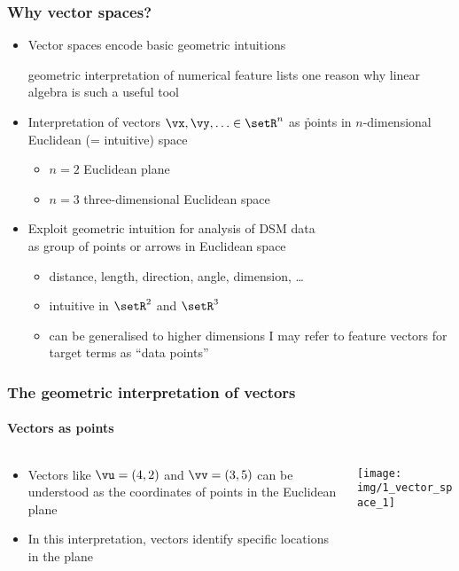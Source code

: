 \begin{frame}
  \frametitle{Why vector spaces?}

  \begin{itemize}
    \item Vector spaces encode basic geometric intuitions
      \begin{itemize}
      \itemhand geometric interpretation of numerical feature lists
      \itemhand one reason why linear algebra is such a useful tool
      \end{itemize}
      \pause\gap
  \item Interpretation of vectors $\vx, \vy, \ldots \in \setR^n$ as
    \h{points} in $n$-dimensional Euclidean (= intuitive) space
    \begin{itemize}
    \item $n=2$ \so Euclidean plane
    \item $n=3$ \so three-dimensional Euclidean space
    \end{itemize}
    \pause\gap
  \item Exploit geometric intuition for analysis of DSM data\\
    as group of points or arrows in Euclidean space
    \begin{itemize}
    \item distance, length, direction, angle, dimension, \ldots
    \item intuitive in $\setR^2$ and $\setR^3$
    \item can be generalised to higher dimensions
    \itemhand I may refer to feature vectors for target terms as ``data points''
    \end{itemize}
  \end{itemize}
\end{frame}

\begin{frame}
  \frametitle{The geometric interpretation of vectors}
  \framesubtitle{Vectors as points}

  \begin{columns}[T]
    \begin{column}{48mm}
      \begin{itemize}
      \item Vectors like $\vu = (4,2)$ and $\vv = (3,5)$ can be understood as
        the coordinates of points in the Euclidean plane
      \item In this interpretation, vectors identify specific locations in the
        plane
      \end{itemize}
    \end{column}
    \begin{column}{55mm}
      \texttt{[image: img/1\_vector\_space\_1]}      
    \end{column}
  \end{columns}
\end{frame}


